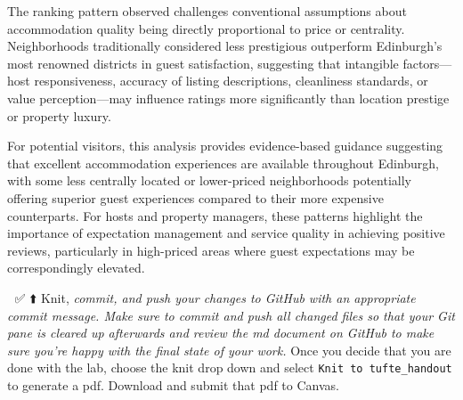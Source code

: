 \documentclass[
]{article}
\begin{document}
The ranking pattern observed challenges conventional assumptions about
accommodation quality being directly proportional to price or
centrality. Neighborhoods traditionally considered less prestigious
outperform Edinburgh's most renowned districts in guest satisfaction,
suggesting that intangible factors---host responsiveness, accuracy of
listing descriptions, cleanliness standards, or value perception---may
influence ratings more significantly than location prestige or property
luxury.

For potential visitors, this analysis provides evidence-based guidance
suggesting that excellent accommodation experiences are available
throughout Edinburgh, with some less centrally located or lower-priced
neighborhoods potentially offering superior guest experiences compared
to their more expensive counterparts. For hosts and property managers,
these patterns highlight the importance of expectation management and
service quality in achieving positive reviews, particularly in
high-priced areas where guest expectations may be correspondingly
elevated.

🧶 ✅ ⬆️ Knit, \emph{commit, and push your changes to GitHub with an
appropriate commit message. Make sure to commit and push all changed
files so that your Git pane is cleared up afterwards and review the md
document on GitHub to make sure you're happy with the final state of
your work.} Once you decide that you are done with the lab, choose the
knit drop down and select \texttt{Knit\ to\ tufte\_handout} to generate
a pdf. Download and submit that pdf to Canvas.
\end{document}
